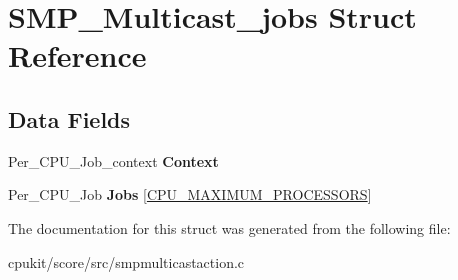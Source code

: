 \hypertarget{structSMP__Multicast__jobs}{}\section{S\+M\+P\+\_\+\+Multicast\+\_\+jobs Struct Reference}
\label{structSMP__Multicast__jobs}
\subsection*{Data Fields}
\begin{DoxyCompactItemize}
\item 
\mbox{\label{structSMP__Multicast__jobs_af7d7b93d4db375ec6d767e1b93b96d7d}} 
Per\+\_\+\+C\+P\+U\+\_\+\+Job\+\_\+context {\bfseries Context}
\item 
\mbox{\label{structSMP__Multicast__jobs_a6aa065deaeb93034cbbcef7130e9a4d2}} 
Per\+\_\+\+C\+P\+U\+\_\+\+Job {\bfseries Jobs} \mbox{[}\mbox{\hyperlink{no__cpu_2include_2rtems_2score_2cpu_8h_adea68a7fa02909edcebee08748f94223}{C\+P\+U\+\_\+\+M\+A\+X\+I\+M\+U\+M\+\_\+\+P\+R\+O\+C\+E\+S\+S\+O\+RS}}\mbox{]}
\end{DoxyCompactItemize}


The documentation for this struct was generated from the following file\+:\begin{DoxyCompactItemize}
\item 
cpukit/score/src/smpmulticastaction.\+c\end{DoxyCompactItemize}
